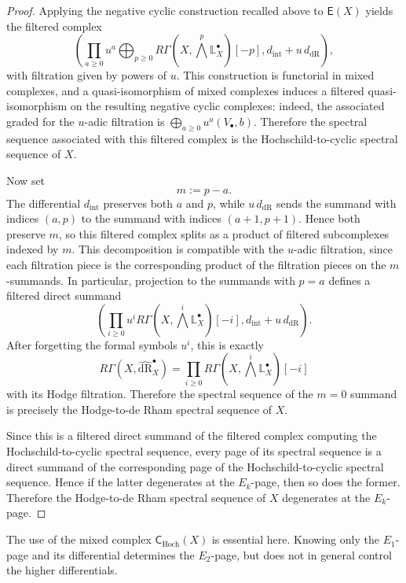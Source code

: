 \documentclass[12pt,reqno]{amsart}
\begin{document}
\begin{proof}
Applying the negative cyclic construction recalled above to \(\mathsf{E}(X)\) yields the filtered complex
\[
\left(
\prod_{a\ge 0}u^a\bigoplus_{p\ge 0}R\Gamma\!\left(X,\bigwedge^p\mathbb{L}^{\bullet}_X\right)[-p],
d_{\mathrm{int}}+u\,d_{\mathrm{dR}}
\right),
\]
with filtration given by powers of \(u\). This construction is functorial in mixed complexes, and a quasi-isomorphism of mixed complexes induces a filtered quasi-isomorphism on the resulting negative cyclic complexes: indeed, the associated graded for the \(u\)-adic filtration is \(\bigoplus_{a\ge 0}u^a(V_{\bullet},b)\). Therefore the spectral sequence associated with this filtered complex is the Hochschild-to-cyclic spectral sequence of \(X\).


Now set
\[
m:=p-a.
\]
The differential \(d_{\mathrm{int}}\) preserves both \(a\) and \(p\), while \(u\,d_{\mathrm{dR}}\) sends the summand with indices \((a,p)\) to the summand with indices \((a+1,p+1)\). Hence both preserve \(m\), so this filtered complex splits as a product of filtered subcomplexes indexed by \(m\). This decomposition is compatible with the \(u\)-adic filtration, since each filtration piece is the corresponding product of the filtration pieces on the \(m\)-summands. In particular, projection to the summands with \(p=a\) defines a filtered direct summand
\[
\left(
\prod_{i\ge 0}u^iR\Gamma\!\left(X,\bigwedge^i\mathbb{L}^{\bullet}_X\right)[-i],
d_{\mathrm{int}}+u\,d_{\mathrm{dR}}
\right).
\]
After forgetting the formal symbols \(u^i\), this is exactly
\[
R\Gamma\!\left(X,\widehat{\mathrm{dR}}_X^{\bullet}\right)
=
\prod_{i\ge 0}R\Gamma\!\left(X,\bigwedge^i\mathbb{L}^{\bullet}_X\right)[-i]
\]
with its Hodge filtration. Therefore the spectral sequence of the \(m=0\) summand is precisely the Hodge-to-de Rham spectral sequence of \(X\).

Since this is a filtered direct summand of the filtered complex computing the
Hochschild-to-cyclic spectral sequence, every page of its spectral sequence is a direct summand of the corresponding page of the Hochschild-to-cyclic spectral sequence. Hence if the latter degenerates at the \(E_k\)-page, then so does the former. Therefore the Hodge-to-de Rham spectral sequence of \(X\) degenerates at the \(E_k\)-page.
\end{proof}

\begin{remark}\label{rem:HC-filtered-complex}
The use of the mixed complex \(\mathsf{C}_{\mathrm{Hoch}}(X)\) is essential here. Knowing only the \(E_1\)-page and its differential determines the \(E_2\)-page,
but does not in general control the higher differentials.
\end{remark}
\end{document}
